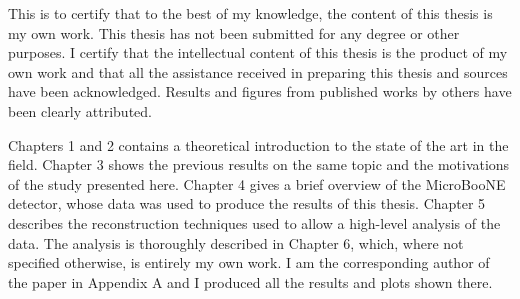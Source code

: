 This is to certify that to the best of my knowledge, the content of this thesis is my own work. This thesis has not been submitted for any degree or other purposes.
I certify that the intellectual content of this thesis is the product of my own work and that all the assistance received in preparing this thesis and sources have been acknowledged. Results and figures from published works by others have been clearly attributed.

Chapters 1 and 2 contains a theoretical introduction to the state of the art in the field. Chapter 3 shows the previous results on the same topic and the motivations of the study presented here. Chapter 4 gives a brief overview of the MicroBooNE detector, whose data was used to produce the results of this thesis. 
Chapter 5 describes the reconstruction techniques used to allow a high-level analysis of the data. The analysis is thoroughly described in Chapter 6, which, where not specified otherwise, is entirely my own work.
I am the corresponding author of the paper in Appendix A and I produced all the results and plots shown there.